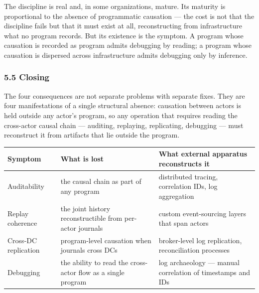 \documentclass[
]{article}
\newcounter{none} %
\begin{document}
The discipline is real and, in some organizations, mature. Its maturity
is proportional to the absence of programmatic causation --- the cost is
not that the discipline fails but that it must exist at all,
reconstructing from infrastructure what no program records. But its
existence is the symptom. A program whose causation is recorded as
program admits debugging by reading; a program whose causation is
dispersed across infrastructure admits debugging only by inference.

\subsubsection{5.5 Closing}\label{closing-1}

The four consequences are not separate problems with separate fixes.
They are four manifestations of a single structural absence: causation
between actors is held outside any actor's program, so any operation
that requires reading the cross-actor causal chain --- auditing,
replaying, replicating, debugging --- must reconstruct it from artifacts
that lie outside the program.

{\def\LTcaptype{none} %
\begin{longtable}[]{@{}
  >{\raggedright\arraybackslash}p{}
  >{\raggedright\arraybackslash}p{}
  >{\raggedright\arraybackslash}p{}@{}}
\toprule\noalign{}
\begin{minipage}[b]{\linewidth}\raggedright
Symptom
\end{minipage} & \begin{minipage}[b]{\linewidth}\raggedright
What is lost
\end{minipage} & \begin{minipage}[b]{\linewidth}\raggedright
What external apparatus reconstructs it
\end{minipage} \\
\midrule\noalign{}
\endhead
\bottomrule\noalign{}
\endlastfoot
Auditability & the causal chain as part of any program & distributed
tracing, correlation IDs, log aggregation \\
Replay coherence & the joint history reconstructible from per-actor
journals & custom event-sourcing layers that span actors \\
Cross-DC replication & program-level causation when journals cross DCs &
broker-level log replication, reconciliation processes \\
Debugging & the ability to read the cross-actor flow as a single program
& log archaeology --- manual correlation of timestamps and IDs \\
\end{longtable}
}
\end{document}
